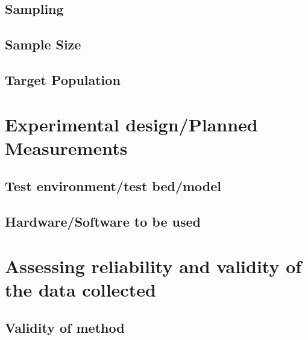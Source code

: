 \subsection{Sampling}

\subsection{Sample Size}

\subsection{Target Population}

\section{Experimental design/Planned Measurements}
\label{sec:experimentalDesign}
\subsection{Test environment/test bed/model} %


\subsection{Hardware/Software to be used}


\section{Assessing reliability and validity of the data collected}
\label{sec:assessingReliability}


\subsection{Validity of method}
\label{sec:validtyOfMethod}

